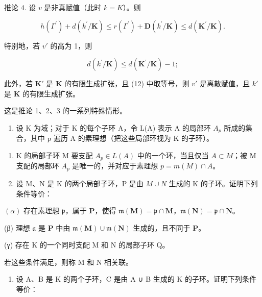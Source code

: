 推论 4. 设 \(v\) 是非真赋值（此时 \(k = K\)）。则

\[
h (\Gamma^ {\prime}) + d (k ^ {\prime} / \mathbf {K}) \leqslant r (\Gamma^ {\prime}) + \mathbf {D} (k ^ {\prime} / \mathbf {K}) \leqslant d (\mathbf {K} ^ {\prime} / \mathbf {K}).\tag{11}
\]

特别地，若 \(v'\) 的高为 1，则

\[
d (k ^ {\prime} / \mathbf {K}) \leqslant d (\mathbf {K} ^ {\prime} / \mathbf {K}) - 1;\tag{12}
\]

此外，若 \(\mathbf{K}'\) 是 \(\mathbf{K}\) 的有限生成扩张，且 (12) 中取等号，则 \(v'\) 是离散赋值，且 \(k'\) 是 \(\mathbf{K}\) 的有限生成扩张。

这是推论 1、2、3 的一系列特殊情形。



\begin{enumerate}
\def\labelenumi{\arabic{enumi}.}
\tightlist
\item
  设 K 为域；对于 K 的每个子环 A，令 L(A) 表示 A 的局部环 \(A_{p}\) 所成的集合，其中 p 遍历 A 的素理想（把这些局部环视为 K 的子环）。
\end{enumerate}

\begin{enumerate}
\def\labelenumi{(\alph{enumi})}
\item
  K 的局部子环 M 要支配 \(A_{p} \in L(A)\) 中的一个环，当且仅当 \(A \subset M\)；被 M 支配的局部环 \(A_{p}\) 是唯一的，并对应于素理想 \(p = m(M) \cap A\)。
\item
  设 M、N 是 K 的两个局部子环，P 是由 \(M \cup N\) 生成的 K 的子环。证明下列条件等价：
\end{enumerate}

\((\alpha)\) 存在素理想 \(\mathfrak{p}\)，属于 \(\mathbf{P}\)，使得 \(\mathfrak{m}(\mathbf{M}) = \mathfrak{p} \cap \mathbf{M}\)，\(\mathfrak{m}(\mathbf{N}) = \mathfrak{p} \cap \mathbf{N}\)。

(β) 理想 \(\mathfrak{a}\) 是 \(\mathbf{P}\) 中由 \(\mathfrak{m}(\mathbf{M}) \cup \mathfrak{m}(\mathbf{N})\) 生成的，且不同于 \(\mathbf{P}\)。

(γ) 存在 K 的一个同时支配 M 和 N 的局部子环 Q。

若这些条件满足，则称 M 和 N 相关联。

\begin{enumerate}
\def\labelenumi{(\alph{enumi})}
\setcounter{enumi}{2}
\tightlist
\item
  设 A、B 是 K 的两个子环，C 是由 A ∪ B 生成的 K 的子环。证明下列条件等价：
\end{enumerate}

